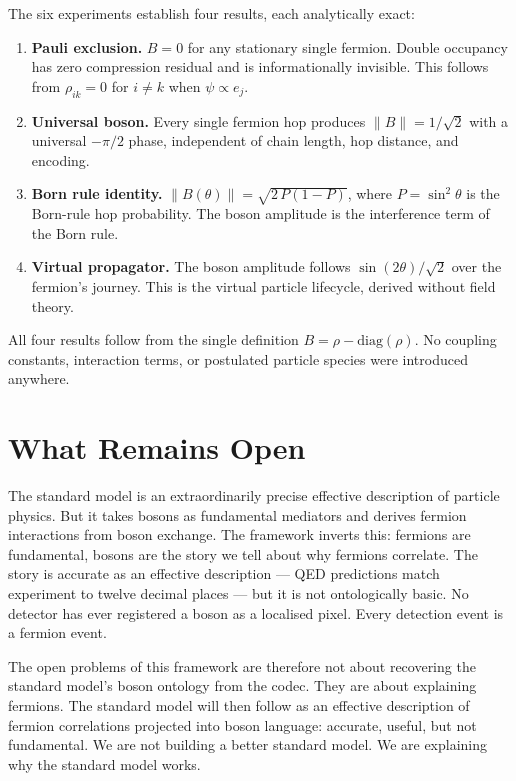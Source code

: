 The six experiments establish four results, each analytically exact:

\begin{enumerate}
    \item \textbf{Pauli exclusion.} $B = 0$ for any stationary single
    fermion. Double occupancy has zero compression residual and is
    informationally invisible. This follows from $\rho_{ik} = 0$ for
    $i \neq k$ when $\psi \propto e_j$.

    \item \textbf{Universal boson.} Every single fermion hop produces
    $\|B\| = 1/\sqrt{2}$ with a universal $-\pi/2$ phase, independent
    of chain length, hop distance, and encoding.

    \item \textbf{Born rule identity.} $\|B(\theta)\| = \sqrt{2\,P(1-P)}$,
    where $P = \sin^2\theta$ is the Born-rule hop probability. The boson
    amplitude is the interference term of the Born rule.

    \item \textbf{Virtual propagator.} The boson amplitude follows
    $\sin(2\theta)/\sqrt{2}$ over the fermion's journey. This is the
    virtual particle lifecycle, derived without field theory.
\end{enumerate}

All four results follow from the single definition $B = \rho -
\mathrm{diag}(\rho)$. No coupling constants, interaction terms, or
postulated particle species were introduced anywhere.

\section{What Remains Open}

The standard model is an extraordinarily precise effective description
of particle physics. But it takes bosons as fundamental mediators and derives fermion interactions
from boson exchange. The framework inverts this: fermions are
fundamental, bosons are the story we tell about why fermions correlate.
The story is accurate as an effective description --- QED predictions
match experiment to twelve decimal places --- but it is not
ontologically basic. No detector has ever registered a boson as a
localised pixel. Every detection event is a fermion event.

The open problems of this framework are therefore not about recovering
the standard model's boson ontology from the codec. They are about
explaining fermions. The standard model will then follow as an
effective description of fermion correlations projected into boson
language: accurate, useful, but not fundamental. We are not building a
better standard model. We are explaining why the standard model works.

